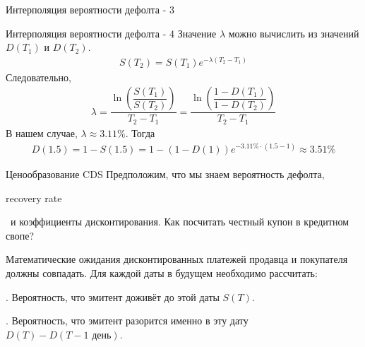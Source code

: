 \documentclass{beamer}
\newcommand{\en}[1]{\begin{otherlanguage}{english}#1\end{otherlanguage}}
\begin{document}
\begin{frame}{Интерполяция вероятности дефолта - 3}
\centering
{}
\end{frame}




\begin{frame}{Интерполяция вероятности дефолта - 4}
\justify
Значение $\lambda$ можно вычислить из значений $D(T_1)$ и $D(T_2)$.
\begin{align*}
S(T_2) = S(T_1)e^{-\lambda(T_2-T_1)}
\end{align*}
Следовательно,
\begin{align*}
\lambda = \dfrac{\ln\left(\dfrac{S(T_1)}{S(T_2)}\right)}{T_2 - T_1} = \dfrac{\ln\left(\dfrac{1 - D(T_1)}{1 - D(T_2)}\right)}{T_2 - T_1}
\end{align*}
В нашем случае, $\lambda \approx 3.11\%$. Тогда
\begin{align*}
D(1.5) = 1 - S(1.5) = 1 - (1 - D(1))e^{-3.11\% \cdot (1.5 - 1)} \approx 3.51\%
\end{align*}
\end{frame}



\begin{frame}{Ценообразование CDS}
\justify
Предположим, что мы знаем вероятность дефолта, \en{recovery rate}\ и коэффициенты дисконтирования. Как посчитать честный купон в кредитном свопе?

\justify
Математические ожидания дисконтированных платежей продавца и покупателя должны совпадать. Для каждой даты в будущем необходимо рассчитать:

. Вероятность, что эмитент доживёт до этой даты $S(T)$.

. Вероятность, что эмитент разорится именно в эту дату $D(T) - D(T - 1 \text{ день})$.
\end{frame}
\end{document}
